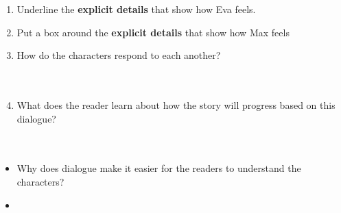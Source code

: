 \documentclass[12pt]{article}
\begin{document}
\begin{tcolorbox}[colframe=black!60, colback=white, 
coltitle=black, colbacktitle=black!15, fonttitle=\bfseries\Large, 
title=Independent Practice, halign title=center, left=10pt, right=10pt, top=10pt, bottom=15pt]

\begin{enumerate}[itemsep=1em]
    \item Underline the \textbf{explicit details} that show how Eva feels.

    \item Put a box around the \textbf{explicit details} that show how Max feels
    \item How do the characters respond to each another?
\\[0.8cm] \underline{\hspace{14cm}}  
    \\[0.8cm] \underline{\hspace{14cm}}  
    \\[0.8cm] \underline{\hspace{14cm}} 
    \item What does the reader learn about how the story will progress based on this dialogue? 
    \\[0.8cm] \underline{\hspace{14cm}}  
    \\[0.8cm] \underline{\hspace{14cm}}  
    \\[0.8cm] \underline{\hspace{14cm}} 
\end{enumerate}
\end{tcolorbox}

\begin{tcolorbox}[colframe=black!60, colback=white, 
coltitle=black, colbacktitle=black!15, fonttitle=\bfseries\Large, 
title=Exit Ticket, halign title=center, left=10pt, right=10pt, top=10pt, bottom=15pt]
\begin{itemize}
    \item Why does dialogue make it easier for the readers to understand the characters?
    \item \vspace{8cm}
\end{itemize}
\end{tcolorbox}
\end{document}
